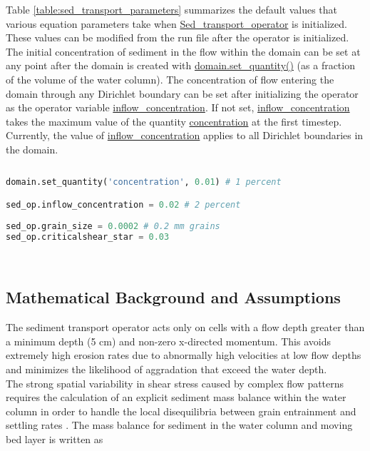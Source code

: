 \documentclass[10pt]{article}
\begin{document}
Table \ref{table:sed_transport_parameters} summarizes the default values that various equation parameters take when \url{Sed_transport_operator} is initialized. These values can be modified from the run file after the operator is initialized.
\ \\

The initial concentration of sediment in the flow within the domain can be set at any point after the domain is created with \url{domain.set_quantity()} (as a fraction of the volume of the water column). The concentration of flow entering the domain through any Dirichlet boundary can be set after initializing the operator as the operator variable \url{inflow_concentration}. If not set, \url{inflow_concentration} takes the maximum value of the quantity \url{concentration} at the first timestep. Currently, the value of \url{inflow_concentration} applies to all Dirichlet boundaries in the domain.

\begin{minipage}[c]{0.95\textwidth}
\begin{lstlisting}[language=Python, title=Modifying parameter values]
 
domain.set_quantity('concentration', 0.01) # 1 percent

sed_op.inflow_concentration = 0.02 # 2 percent
 
sed_op.grain_size = 0.0002 # 0.2 mm grains
sed_op.criticalshear_star = 0.03

\end{lstlisting}
\end{minipage}
\ \\

\subsection{Mathematical Background and Assumptions}

The sediment transport operator acts only on cells with a flow depth greater than a minimum depth (5 cm) and non-zero x-directed momentum. This avoids extremely high erosion rates due to abnormally high velocities at low flow depths and minimizes the likelihood of aggradation that exceed the water depth.
\ \\

The strong spatial variability in shear stress caused by complex flow patterns requires the calculation of an explicit sediment mass balance within the water column in order to handle the local disequilibria between grain entrainment and settling rates \citep{davy2009fluvial}. The mass balance for sediment in the water column and moving bed layer is written as
\end{document}
